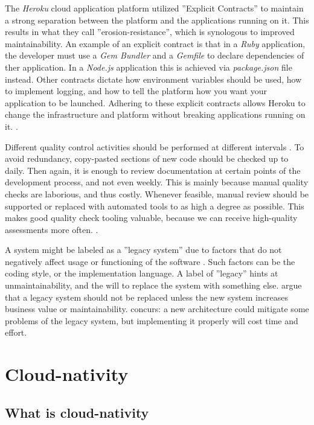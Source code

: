 \documentclass[utf8,english]{gradu3}
\begin{document}
The \textit{Heroku} cloud application platform \parencite{Heroku2011} utilized
''Explicit Contracts'' to maintain a strong separation between the platform
and the applications running on it. This results in what they call
''erosion-resistance'', which is synologous to improved maintainability. An
example of an explicit contract is that in a \textit{Ruby} application, the
developer must use a \textit{Gem Bundler} and a \textit{Gemfile} to declare
dependencies of ther application. In a \textit{Node.js} application this is
achieved via \textit{package.json} file instead. Other contracts dictate how
environment variables should be used, how to implement logging, and how to tell
the platform how you want your application to be launched. Adhering to these
explicit contracts allows Heroku to change the infrastructure and platform
without breaking applications running on it. \parencite{Heroku2011}.

Different quality control activities should be performed at different intervals
\parencite[25]{Broy2006}. To avoid redundancy, copy-pasted sections of new code
should be checked up to daily. Then again, it is enough to review documentation
at certain points of the development process, and not even weekly. This is
mainly because manual quality checks are laborious, and thus costly. Whenever
feasible, manual review should be supported or replaced with automated tools to
as high a degree as possible. This makes good quality check tooling valuable,
because we can receive high-quality assessments more often.
\parencite[25]{Broy2006}.

A system might be labeled as a ''legacy system'' due to factors that do not
negatively affect usage or functioning of the software \parencite[22]{Broy2006}.
Such factors can be the coding style, or the implementation language. A label of
''legacy'' hints at unmaintainability, and the will to replace the system with
something else. \textcite[22]{Broy2006} argue that a legacy system should not be
replaced unless the new system increases business value or maintainability.
\textcite[18]{Li2021} concurs: a new architecture could mitigate some problems
of the legacy system, but implementing it properly will cost time and effort.


\section{Cloud-nativity}

\subsection{What is cloud-nativity}
\end{document}
